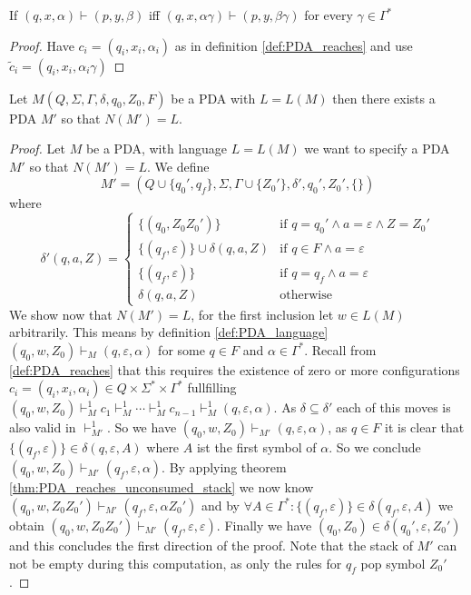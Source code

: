 \begin{theorem}\label{thm:PDA_reaches_unconsumed_stack}
  If $(q,x,\alpha)\vdash(p,y,\beta)$ iff $(q,x,\alpha\gamma)\vdash(p,y,\beta\gamma)$ for
  every $\gamma\in\Gamma^*$
\end{theorem}
\begin{proof}
  Have $c_i = (q_i,x_i,\alpha_i)$ as in definition \ref{def:PDA_reaches} and use
  $\tilde{c}_i = (q_i,x_i,\alpha_i\gamma)$
\end{proof}
\begin{theorem}\label{thm:PDA_empty_stack_of_final_state}
  Let $M(Q,\Sigma,\Gamma,\delta,q_0,Z_0,F)$ be a PDA with $L=L(M)$ then there exists a PDA $M'$ so that $N(M')=L.$
\end{theorem}
\begin{proof}
  Let $M$ be a PDA, with language $L=L(M)$ we want to specify a PDA $M'$ so that
  $N(M')=L$. We define
  \[
  M' =(Q\cup\{q_0',q_f\},\Sigma,\Gamma\cup\{Z_0'\},\delta',q_0',Z_0',\{\})
  \]
  where
  \[
  \delta'(q,a,Z) =
  \begin{cases}
    \{(q_0,Z_0Z_0')\} & \text{if } q=q_0'\land a=\varepsilon \land Z=Z_0' \\
    \{(q_f,\varepsilon)\}\cup\delta(q,a,Z)  & \text{if } q\in F\land a=\varepsilon \\
    \{(q_f,\varepsilon)\} & \text{if } q=q_f \land a=\varepsilon \\
    \delta(q,a,Z) & \text{otherwise}
  \end{cases}
  \]
  We show now that $N(M')=L$, for the first inclusion let $w\in L(M)$ arbitrarily.
  This means by definition
  \ref{def:PDA_language} $(q_0,w,Z_0)\vdash_M(q,\varepsilon,\alpha)$ for some $q\in F$ and
  $\alpha\in\Gamma^*$. Recall from \ref{def:PDA_reaches} that this requires the existence
  of zero or more configurations $c_i=(q_i,x_i,\alpha_i)\in Q\times\Sigma^*\times\Gamma^*$
  fullfilling
  $(q_0,w,Z_0)\vdash^1_M c_1\vdash^1_M\cdots\vdash^1_M c_{n-1}\vdash^1_M(q,\varepsilon,\alpha)$.
  As $\delta\subseteq\delta'$ each of this moves is also valid in $\vdash^1_{M'}$.
  So we have $(q_0,w,Z_0)\vdash_{M'}(q,\varepsilon,\alpha)$, as $q\in F$ it is clear that
  $\{(q_f,\varepsilon)\}\in \delta(q,\varepsilon,A)$ where $A$ ist the first symbol of $\alpha$.
  So we conclude  $(q_0,w,Z_0)\vdash_{M'}(q_f,\varepsilon,\alpha)$.
  By applying theorem \ref{thm:PDA_reaches_unconsumed_stack} we now know
  $(q_0,w,Z_0Z_0')\vdash_{M'}(q_f,\varepsilon,\alpha Z_0')$
  and by $\forall A\in\Gamma^*:\{(q_f,\varepsilon)\}\in\delta(q_f,\varepsilon,A)$ we obtain
  $(q_0,w,Z_0Z_0')\vdash_{M'}(q_f,\varepsilon,\varepsilon)$. Finally we have
  $(q_0,Z_0)\in\delta(q_0',\varepsilon,Z_0')$ and this concludes the first direction of
  the proof. Note that the stack of $M'$ can not be empty during this computation, as only the rules
  for $q_f$ pop symbol $Z_0'$.



\end{proof}
